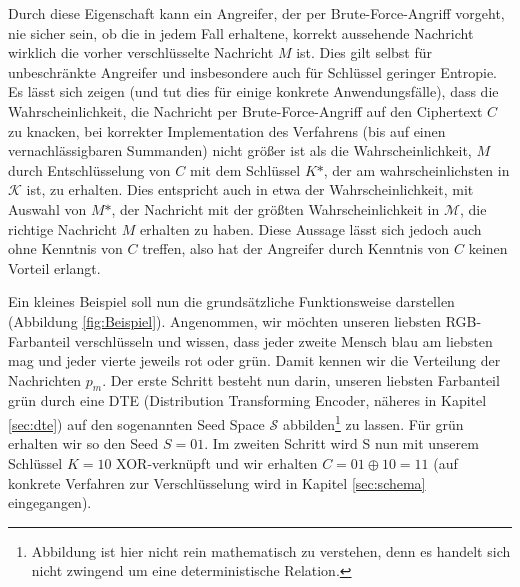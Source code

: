 Durch diese Eigenschaft kann ein Angreifer, der per Brute-Force-Angriff vorgeht, nie sicher sein, ob die in jedem Fall erhaltene, korrekt aussehende Nachricht wirklich die vorher verschlüsselte Nachricht \(M\) ist. Dies gilt selbst für unbeschränkte Angreifer und insbesondere auch für Schlüssel geringer Entropie. Es lässt sich zeigen (und \cite{EURO2014} tut dies für einige konkrete Anwendungsfälle), dass die Wahrscheinlichkeit, die Nachricht per Brute-Force-Angriff auf den Ciphertext \(C\) zu knacken, bei korrekter Implementation des Verfahrens (bis auf einen vernachlässigbaren Summanden) nicht größer ist als die Wahrscheinlichkeit, \(M\) durch Entschlüsselung von \(C\) mit dem Schlüssel \(K\text{*}\), der am wahrscheinlichsten in \(\mathcal{K}\) ist, zu erhalten. Dies entspricht auch in etwa der Wahrscheinlichkeit, mit Auswahl von \(M\text{*}\), der Nachricht mit der größten Wahrscheinlichkeit in \(\mathcal{M}\), die richtige Nachricht \(M\) erhalten zu haben. Diese Aussage lässt sich jedoch auch ohne Kenntnis von \(C\) treffen, also hat der Angreifer durch Kenntnis von \(C\) keinen Vorteil erlangt.

Ein kleines Beispiel soll nun die grundsätzliche Funktionsweise darstellen (Abbildung \ref{fig:Beispiel}). Angenommen, wir möchten unseren liebsten RGB-Farbanteil verschlüsseln und wissen, dass jeder zweite Mensch blau am liebsten mag und jeder vierte jeweils rot oder grün. Damit kennen wir die Verteilung der Nachrichten \(p_m\). Der erste Schritt besteht nun darin, unseren liebsten Farbanteil grün durch eine DTE (Distribution Transforming Encoder, näheres in Kapitel \ref{sec:dte}) auf den sogenannten Seed Space \(\mathcal{S}\) abbilden\footnote{Abbildung ist hier nicht rein mathematisch zu verstehen, denn es handelt sich nicht zwingend um eine deterministische Relation.} zu lassen. Für grün erhalten wir so den Seed \(S=01\). Im zweiten Schritt wird S nun mit unserem Schlüssel \(K=10\) XOR-verknüpft und wir erhalten \(C=01 \oplus 10 = 11\) (auf konkrete Verfahren zur Verschlüsselung wird in Kapitel \ref{sec:schema} eingegangen).

